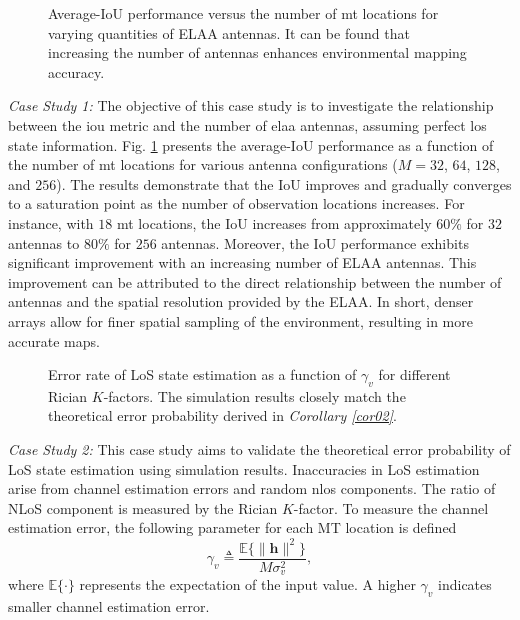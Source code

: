 \documentclass[conference, a4paper]{IEEEtran}
\newcommand{\corref}[1]{{\it Corollary \ref{#1}}}
\newcommand{\figref}[1]{Fig. \ref{#1}}
\begin{document}
\begin{figure}[t]
	\caption{\label{fig03} Average-IoU performance versus the number of \gls{mt} locations for varying quantities of ELAA antennas. It can be found that increasing the number of antennas enhances environmental mapping accuracy.}	
	\vspace{-0em}
\end{figure}

{\it Case Study 1:}
The objective of this case study is to investigate the relationship between the \gls{iou} metric and the number of \gls{elaa} antennas, assuming perfect \gls{los} state information. 
\figref{fig03} presents the average-IoU performance as a function of the number of \gls{mt} locations for various antenna configurations ($M = 32$, $64$, $128$, and $256$). 
The results demonstrate that the IoU improves and gradually converges to a saturation point as the number of observation locations increases.
For instance, with $18$ \gls{mt} locations, the IoU increases from approximately $60\%$ for $32$ antennas to $80\%$ for $256$ antennas.
Moreover, the IoU performance exhibits significant improvement with an increasing number of ELAA antennas.
This improvement can be attributed to the direct relationship between the number of antennas and the spatial resolution provided by the ELAA.
In short, denser arrays allow for finer spatial sampling of the environment, resulting in more accurate maps.

\begin{figure}[t]
	\centering
	\caption{\label{fig04} Error rate of LoS state estimation as a function of $\gamma_{v}$ for different Rician $K$-factors. The simulation results closely match the theoretical error probability derived in \corref{cor02}.}
	\vspace{-1em}
\end{figure}

{\it Case Study 2:}
This case study aims to validate the theoretical error probability of LoS state estimation using simulation results.
Inaccuracies in LoS estimation arise from channel estimation errors and random \gls{nlos} components.
The ratio of NLoS component is measured by the Rician $K$-factor.
To measure the channel estimation error, the following parameter for each MT location is defined
\begin{equation}
	\gamma_{v} \triangleq \dfrac{\mathbb{E}\{\|\mathbf{h}\|^{2}\}}{M\sigma_{v}^{2}},
\end{equation}
where $\mathbb{E}\{\cdot\}$ represents the expectation of the input value.
A higher $\gamma_{v}$ indicates smaller channel estimation error.
\end{document}
